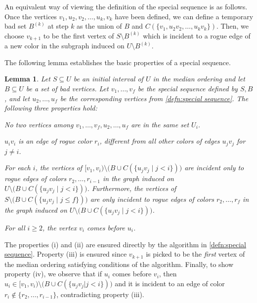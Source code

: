 \documentclass[a4paper,11pt]{article}
\makeatletter
\renewenvironment{proof}[1][\proofname] {\par\pushQED{\qed}\normalfont\topsep6\p@\@plus6\p@\relax\trivlist\item[\hskip\labelsep\bfseries#1\@addpunct{.}]\ignorespaces}{\popQED\endtrivlist\@endpefalse}
\newtheorem{lemma}[theorem]{\bf Lemma}
\theoremstyle{definition}
\makeatother
\begin{document}
An equivalent way of viewing the definition of the special sequence is as follows. Once the vertices $v_1, u_2, v_2, \dots, u_k, v_k$ have been defined, we can define a temporary bad set $B^{(k)}$ at step $k$ as the union of $B$ and $C(\{v_1, u_2v_2, \dots, u_kv_k\})$. Then, we choose $v_{k+1}$ to be the first vertex of $S\setminus B^{(k)}$ which is incident to a rogue edge of a new color in the subgraph induced on $U\setminus B^{(k)}$. 

The following lemma establishes the basic properties of a special sequence.

\begin{lemma}\label{lemma:properties of special sequences}
Let $S\subseteq U$ be an initial interval of $U$ in the median ordering and let $B\subseteq U$ be a set of bad vertices. Let $v_1,\dots,v_f$ be the special sequence defined by $S,B$, and let $u_2,\dots,u_f$ be the corresponding vertices from \cref{defn:special sequence}. 
The following three properties hold:
\begin{lemenum}
   \item No two vertices among $v_1, \dots, v_f, u_2, \dots, u_f$ are in the same set $U_i$.\label{lemit:i}
   \item $u_iv_i$ is an edge of rogue color $r_i$, different from all other colors of edges $u_jv_j$ for $j\neq i$.\label{lemit:ii}
   \item For each $i$, the vertices of $[v_1, v_i) \setminus \big(B\cup C(\{u_jv_j\mid j<i\})\big)$ are incident only to rogue edges of colors $r_2, \dots, r_{i-1}$ in the graph induced on $U\setminus\big(B\cup C(\{u_jv_j\mid j<i\})\big)$. Furthermore, the vertices of $S\setminus \big(B\cup C(\{u_jv_j\mid j\leq f\})\big)$ are only incident to rogue edges of colors $r_2, \dots, r_f$ in the graph induced on $U\setminus\big(B\cup C(\{u_jv_j\mid j<i\})\big)$. \label{lemit:iii}
   \item For all $i\geq 2$, the vertex $v_i$ comes before $u_i$. \label{lemit:iv}
\end{lemenum}
\end{lemma}
\begin{proof}
The properties (i) and (ii) are ensured directly by the algorithm in \cref{defn:special sequence}. Property (iii) is ensured since $v_{k+1}$ is picked to be the \textit{first} vertex of the median ordering satisfying conditions of the algorithm. Finally, to show property (iv), we observe that if $u_i$ comes before $v_i$, then $u_i\in [v_1, v_i) \setminus \big(B\cup C(\{u_jv_j|j<i\})\big)$ and it is incident to an edge of color $r_i\notin \{r_2, \dots, r_{i-1}\}$, contradicting property (iii).
\end{proof}
\end{document}
